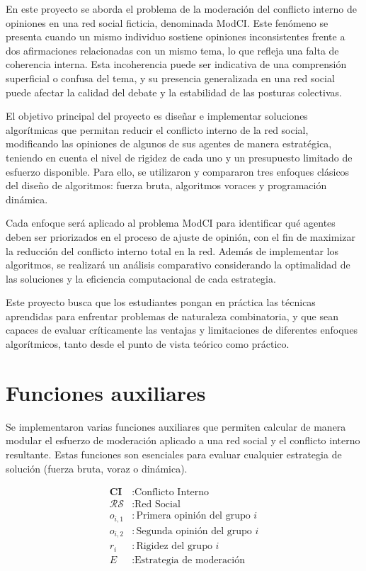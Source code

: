 \documentclass[11pt,letter]{article}
\begin{document}
En este proyecto se aborda el problema de la moderación del conflicto interno de opiniones en una red social ficticia, denominada ModCI. Este fenómeno se presenta cuando un mismo individuo sostiene opiniones inconsistentes frente a dos afirmaciones relacionadas con un mismo tema, lo que refleja una falta de coherencia interna. Esta incoherencia puede ser indicativa de una comprensión superficial o confusa del tema, y su presencia generalizada en una red social puede afectar la calidad del debate y la estabilidad de las posturas colectivas.

El objetivo principal del proyecto es diseñar e implementar soluciones algorítmicas que permitan reducir el conflicto interno de la red social, modificando las opiniones de algunos de sus agentes de manera estratégica, teniendo en cuenta el nivel de rigidez de cada uno y un presupuesto limitado de esfuerzo disponible. Para ello, se utilizaron y compararon tres enfoques clásicos del diseño de algoritmos: fuerza bruta, algoritmos voraces y programación dinámica.

Cada enfoque será aplicado al problema ModCI para identificar qué agentes deben ser priorizados en el proceso de ajuste de opinión, con el fin de maximizar la reducción del conflicto interno total en la red. Además de implementar los algoritmos, se realizará un análisis comparativo considerando la optimalidad de las soluciones y la eficiencia computacional de cada estrategia.

Este proyecto busca que los estudiantes pongan en práctica las técnicas aprendidas para enfrentar problemas de naturaleza combinatoria, y que sean capaces de evaluar críticamente las ventajas y limitaciones de diferentes enfoques algorítmicos, tanto desde el punto de vista teórico como práctico.

\newpage

\section{Funciones auxiliares}

    Se implementaron varias funciones auxiliares que permiten calcular de manera modular el esfuerzo de moderación aplicado a una red social y el conflicto interno resultante. Estas funciones son esenciales para evaluar cualquier estrategia de solución (fuerza bruta, voraz o dinámica).

    \[
\begin{aligned}
\textbf{CI} &: \text{Conflicto Interno} \\
\mathcal{RS} &: \text{Red Social} \\
o_{i,1} &: \text{Primera opinión del grupo } i \\
o_{i,2} &: \text{Segunda opinión del grupo } i \\
r_i &: \text{Rigidez del grupo } i \\
E &: \text{Estrategia de moderación}
\end{aligned}
\]
\end{document}
